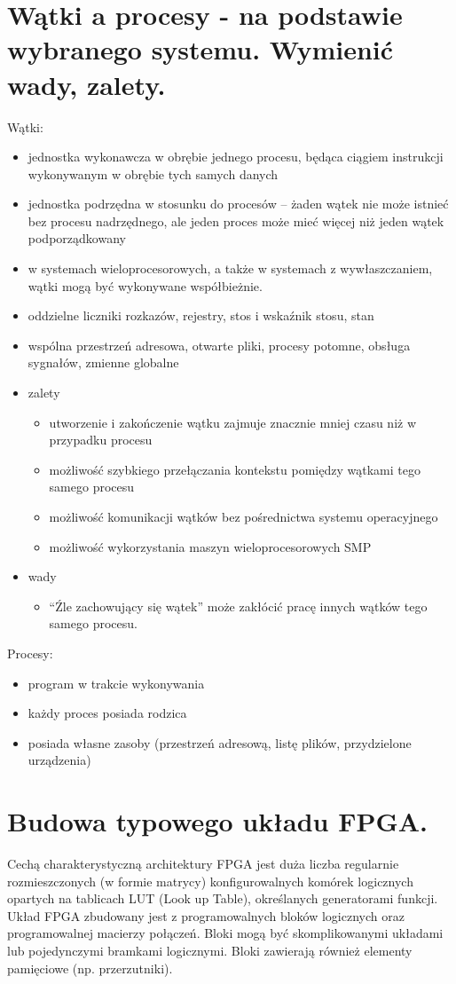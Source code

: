 \documentclass[12pt,a4paper]{article}
\begin{document}
	\section{Wątki a procesy - na podstawie wybranego systemu. Wymienić wady, zalety.}
	Wątki:
	\begin{itemize}
		\item jednostka wykonawcza w obrębie jednego procesu, będąca ciągiem instrukcji wykonywanym w obrębie tych samych danych
		\item jednostka podrzędna w stosunku do procesów – żaden wątek nie może istnieć bez procesu nadrzędnego, ale jeden proces może mieć więcej niż jeden wątek podporządkowany
		\item w systemach wieloprocesorowych, a także w systemach z wywłaszczaniem, wątki mogą być wykonywane współbieżnie.
		\item oddzielne liczniki rozkazów, rejestry, stos i wskaźnik stosu, stan
		\item wspólna przestrzeń adresowa, otwarte pliki, procesy potomne, obsługa sygnałów, zmienne globalne
		\item zalety
		\begin{itemize}
			\item utworzenie i zakończenie wątku zajmuje znacznie mniej czasu niż w przypadku procesu
			\item możliwość szybkiego przełączania kontekstu pomiędzy wątkami tego samego procesu
			\item możliwość komunikacji wątków bez pośrednictwa systemu operacyjnego
			\item możliwość wykorzystania maszyn wieloprocesorowych SMP
		\end{itemize}
		\item wady
		\begin{itemize}
			\item “Źle zachowujący się wątek” może zakłócić pracę innych wątków tego samego procesu.
		\end{itemize}
	\end{itemize}
	
	Procesy:
	\begin{itemize}
		\item program w trakcie wykonywania
		\item każdy proces posiada rodzica
		\item posiada własne zasoby (przestrzeń adresową, listę plików, przydzielone urządzenia)
	\end{itemize}

	\section{Budowa typowego układu FPGA.}
	Cechą charakterystyczną architektury FPGA jest duża liczba regularnie rozmieszczonych (w formie matrycy) konfigurowalnych komórek logicznych opartych na tablicach LUT (Look up Table), określanych generatorami funkcji. Układ FPGA zbudowany jest z programowalnych bloków logicznych oraz programowalnej macierzy połączeń. Bloki mogą być skomplikowanymi układami lub pojedynczymi bramkami logicznymi. Bloki zawierają również elementy pamięciowe (np. przerzutniki).
\end{document}
